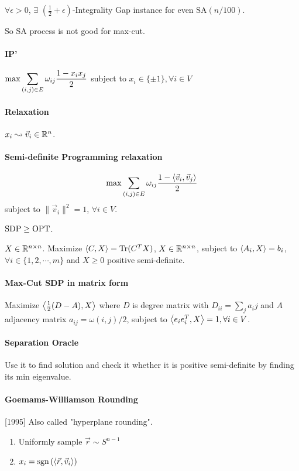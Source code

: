 \begin{theorem}
    $ \forall \epsilon>0 $,  $ \exists  $  $ (\frac{1}{2}+\epsilon) $-Integrality Gap instance for even  $ \mathrm{SA}(n/100) $.
\end{theorem}

So SA process is not good for max-cut.

\paragraph{IP'}  $ \max \displaystyle\sum_{(i,j)\in E}\omega_{ij}\frac{1-x_ix_j}{2} $ subject to  $ x_i\in\{\pm 1\},\forall i\in V $ 

\paragraph{Relaxation}  $ x_i\leadsto \vec{v}_i\in \mathbb R^n $.

\paragraph{Semi-definite Programming relaxation}
\[\max \sum_{(i,j)\in E}\omega_{ij}\frac{1-\left<\vec{v}_i,\vec{v}_j\right>}{2}\]
subject to  $ \|\vec{v}_i\|^2=1 $,  $ \forall i\in V $.

\begin{fact}
    $ \mathrm{SDP} \geq \mathrm{OPT} $. 
\end{fact}

\begin{definition}
    $ X\in \mathbb R^{n\times n} $. Maximize  $ \left<C,X\right>=\mathrm{Tr}(C^TX) $,  $ X\in \mathbb R^{n\times n} $, subject to  $ \left<A_i,X\right>=b_i $,  $ \forall i\in\{1,2,\cdots, m\} $ and  $ X \geq 0 $ positive semi-definite.    
\end{definition}

\paragraph{Max-Cut SDP in matrix form}
Maximize  $ \left<\frac{1}{2}(D-A),X\right> $ where  $ D $ is degree matrix with  $ D_{ii}=\sum_{j}a_ij $ and  $ A $ adjacency matrix  $ a_{ij}=\omega(i,j)/2 $, subject to  $ \left<e_ie_i^T,X\right>=1,\forall i\in V $.

\paragraph{Separation Oracle} Use it to find solution and check it whether it is positive semi-definite by finding its min eigenvalue.

\paragraph{Goemams-Williamson Rounding}[1995]
Also called "hyperplane rounding".

\begin{enumerate}
    \item Uniformly sample  $ \vec{r}\sim S^{n-1} $
    \item  $ x_i=\mathrm{sgn}\left(\left<\vec{r},\vec{v}_i\right>\right) $  
\end{enumerate}

